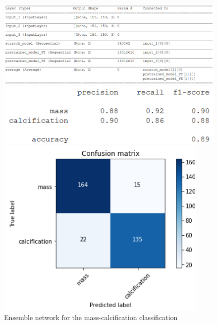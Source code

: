 \documentclass[11pt,a4paper,oneside]{article}
\begin{document}
\begin{figure}[h]
\centering
	\begin{minipage}[c]{.9\textwidth}
		\centering\setlength{\captionmargin}{0pt}%
		\includegraphics[width=.9\textwidth]{images/5/1_model}
		\caption{ Ensemble network for the mass-calcification classification}
	\end{minipage}
	
	\begin{minipage}[c]{.45\textwidth}
		\centering\setlength{\captionmargin}{0pt}%
		\includegraphics[width=.9\textwidth]{images/5/1_accuracy}
	\end{minipage}
	\begin{minipage}[c]{.45\textwidth}
		\centering\setlength{\captionmargin}{0pt}%
		\includegraphics[width=.9\textwidth]{images/5/1_matrix}
	\end{minipage}
\end{figure}
\end{document}
